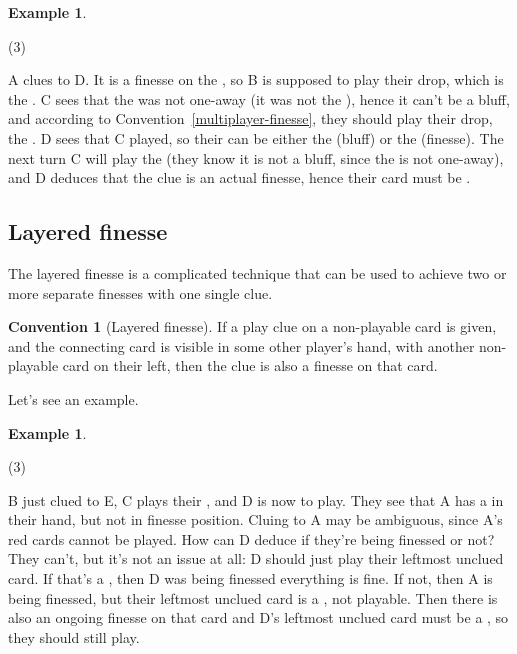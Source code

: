 \documentclass[a4paper]{article}
\theoremstyle{plain}
\theoremstyle{definition}
\newtheorem{example}[theorem]{Example}
\newtheorem{convention}[theorem]{Convention}
\begin{document}
\begin{example}
	\hfill
	\begin{tasks}(3)
		\task[+]      
		\task[A]    
		\task[B]    
		\task[C]    
		\task[D]    
		\task[E]    
	\end{tasks}
	
	A clues  to D. It is a finesse on the , so B is supposed to play their drop, which is the . C sees that the  was not one-away (it was not the ), hence it can't be a bluff, and according to Convention~\ref{multiplayer-finesse}, they should play their drop, the . D sees that C played, so their  can be either the  (bluff) or the  (finesse). The next turn C will play the  (they know it is not a bluff, since the  is not one-away), and D deduces that the clue is an actual finesse, hence their card must be .
\end{example}

\subsection{Layered finesse}

The layered finesse is a complicated technique that can be used to achieve two or more separate finesses with one single clue.

\begin{convention}[Layered finesse]
	\label{layered-finesse}
	If a play clue on a non-playable card is given, and the connecting card is visible in some other player's hand, with another non-playable card on their left, then the clue is also a finesse on that card.
\end{convention}

Let's see an example.

\begin{example}
	\hfill	
	\begin{tasks}(3)
		\task[+]      
		\task[A]    
		\task[B]    
		\task[C]    
		\task[D]    
		\task[E]    
	\end{tasks}
	
	B just clued  to E, C plays their , and D is now to play. They see that A has a  in their hand, but not in finesse position. Cluing  to A may be ambiguous, since A's red cards cannot be played. How can D deduce if they're being finessed or not? They can't, but it's not an issue at all: D should just play their leftmost unclued card. If that's a , then D was being finessed everything is fine. If not, then A is being finessed, but their leftmost unclued card is a , not playable. Then there is also an ongoing finesse on that card and D's leftmost unclued card must be a , so they should still play.	
\end{example}
\end{document}
